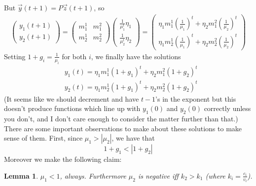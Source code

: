 \documentclass{article}
\theoremstyle{theorem}
\newtheorem{lemma}{Lemma}[section]
\begin{document}
But $\vec{y}(t+1) = P\vec{z}(t+1)$, so 
\begin{align}
	 \begin{pmatrix} y_1(t+1) \\ y_2(t+1) \end{pmatrix} = \begin{pmatrix} m^1_1 & m^2_1 \\ m^1_2 & m^2_2 \end{pmatrix} \begin{pmatrix} \frac{1}{\mu_1^t}\eta_1 \\ \frac{1}{\mu_2^t}\eta_2 \end{pmatrix} = \begin{pmatrix} \eta_1 m_1^1 \left(\frac{1}{\mu_1} \right)^t + \eta_2 m_1^2 \left( \frac{1}{\mu_2} \right)^t \\ \eta_1 m^1_2\left(\frac{1}{\mu_1} \right)^t + \eta_2 m^2_2 \left( \frac{1}{\mu_2} \right)^t \end{pmatrix}
\end{align} 
Setting $1 + g_i = \frac{1}{\mu_i}$ for both $i$, we finally have the solutions
\begin{align}
	& y_1(t) = \eta_1 m_1^1(1+g_1)^t + \eta_2 m_1^2 (1+g_2)^t \\
	& y_2(t) = \eta_1 m_2^1(1+g_1)^t + \eta_2 m_2^2 (1+g_2)^t
\end{align}
(It seems like we should decrement and have $t-1$'s in the exponent but this doesn't produce functions which line up with $y_1(0)$ and $y_2(0)$ correctly unless you don't, and I don't care enough to consider the matter further than that.)
There are some important observations to make about these solutions to make sense of them. First, since $\mu_1 > |\mu_2|$, we have that 
\[ 1+g_1 < |1+g_2| \]
Moreover we make the following claim:
\begin{lemma}
	$\mu_1 < 1$, always. Furthermore $\mu_2$ is negative iff $k_2 > k_1$ (where $k_i = \frac{c_i}{v_i}$). 
\end{lemma}
\end{document}
